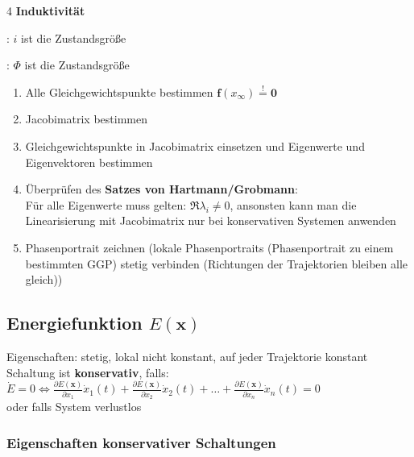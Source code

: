\documentclass[fs, footer]{latex4ei}
\begin{document}
\begin{multicols*}{4}
        \textbf{Induktivität}
        \begin{description}[labelindent=3mm]
        \item[stromgesteuert]: $i$ ist die Zustandsgröße
        \item[nur flussgesteuert]: $\Phi$ ist die Zustandsgröße
        \end{description}

        \begin{enumerate}
        \item Alle Gleichgewichtspunkte bestimmen $\mathbf{f}(x_\infty) \stackrel{!}{=} \mathbf{0}$
        \item Jacobimatrix bestimmen
        \item Gleichgewichtspunkte in Jacobimatrix einsetzen und Eigenwerte und Eigenvektoren bestimmen
        \item Überprüfen des \textbf{Satzes von Hartmann/Grobmann}: \\Für alle Eigenwerte muss gelten: $\Re{\lambda_i} \neq 0$, ansonsten kann man die Linearisierung mit Jacobimatrix nur bei konservativen Systemen anwenden
        \item Phasenportrait zeichnen (lokale Phasenportraits (Phasenportrait zu einem bestimmten GGP) stetig verbinden (Richtungen der Trajektorien bleiben alle gleich))
        \end{enumerate}
        \subsection{Energiefunktion $E(\mathbf{x})$}
        Eigenschaften: stetig, lokal nicht konstant, auf jeder Trajektorie konstant\\
        Schaltung ist \textbf{konservativ}, falls:\\
    $\dot{E} = 0 \Leftrightarrow \frac{\partial E(\mathbf{x})}{\partial x_1} \dot{x}_1(t) + \frac{\partial E(\mathbf{x})}{\partial x_2} \dot{x}_2(t) + \hdots + \frac{\partial E(\mathbf{x})}{\partial x_n} \dot{x}_n(t) = 0$ \\
    oder falls System verlustlos
        \subsubsection{Eigenschaften konservativer Schaltungen}

\end{multicols*}
\end{document}
